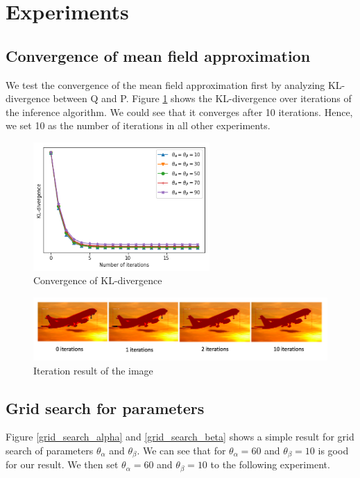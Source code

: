 \documentclass{article}
\begin{document}
\section{Experiments}

\subsection{Convergence of mean field approximation}

We test the convergence of the mean field approximation first by analyzing KL-divergence between Q and P. Figure \ref{kl-divergence} shows the KL-divergence over iterations of the inference algorithm. We could see that it converges after 10 iterations. Hence, we set 10 as the number of iterations in all other experiments.

\begin{figure}
  \centering
  \includegraphics[width=0.6\textwidth]{kl_divergence.png}
  \caption{Convergence of KL-divergence}
  \label{kl-divergence}
\end{figure}

\begin{figure}
  \centering
  \includegraphics[width=14cm]{iteration.png}
  \caption{Iteration result of the image}
  \label{iteration_result}
\end{figure}  

\subsection{Grid search for parameters}

Figure \ref{grid_search_alpha} and \ref{grid_search_beta} shows a simple result for grid search of parameters $\theta_{\alpha}$ and $\theta_{\beta}$. We can see that for $\theta_{\alpha}=60$ and $\theta_{\beta}=10$ is good for our result. We then set $\theta_{\alpha}=60$ and $\theta_{\beta}=10$ to the following experiment.
\end{document}
